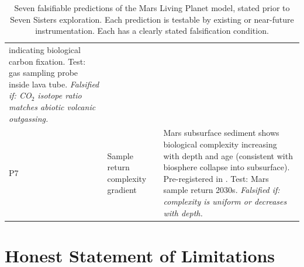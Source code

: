 \documentclass[11pt, a4paper]{article}
\begin{document}
\begin{table}[h]
\begin{tabularx}{\linewidth}{p{0.4cm}p{2.6cm}X}
  indicating biological carbon fixation.
  Test: gas sampling probe inside lava tube.
  \textit{Falsified if: CO$_2$ isotope ratio
  matches abiotic volcanic outgassing.} \\[0.3em]
P7 & Sample return complexity gradient &
  Mars subsurface sediment shows biological
  complexity increasing with depth and age
  (consistent with biosphere collapse into
  subsurface). Pre-registered in
  \cite{collapse_emergence}.
  Test: Mars sample return 2030s.
  \textit{Falsified if: complexity is uniform
  or decreases with depth.} \\
\bottomrule
\end{tabularx}
\caption{Seven falsifiable predictions of the
  Mars Living Planet model, stated prior to
  Seven Sisters exploration.
  Each prediction is testable by existing
  or near-future instrumentation.
  Each has a clearly stated falsification
  condition.}
\end{table}

\section{Honest Statement of Limitations}
\end{document}
